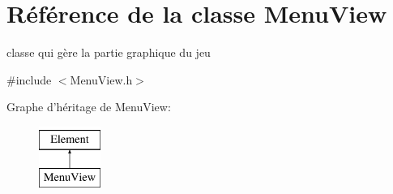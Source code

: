 \hypertarget{classMenuView}{
\section{Référence de la classe MenuView}
\label{classMenuView}
}


classe qui gère la partie graphique du jeu  




{\ttfamily \#include $<$MenuView.h$>$}

Graphe d'héritage de MenuView:\begin{figure}[H]
\begin{center}
\leavevmode
\includegraphics[height=2.000000cm]{classMenuView}
\end{center}
\end{figure}
